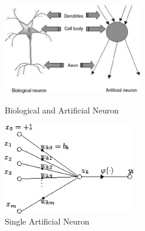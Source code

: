 \begin{figure}[H]
	\centering
	\includegraphics[height=4cm]{images/Fig-1-Analogy-between-artificial-neuron-and-biological-neuron.png}
	\caption{Biological and Artificial Neuron \cite{analogyneurons}}
	\label{fig:artifical_and_biological}
	\endminipage\hfill
	\includegraphics[height=4cm]{images/artificial_neuron.png}
	\caption{Single Artificial Neuron \cite{artificialneuron}}
	\label{fig:artificial_neuron}
	\endminipage
\end{figure}

